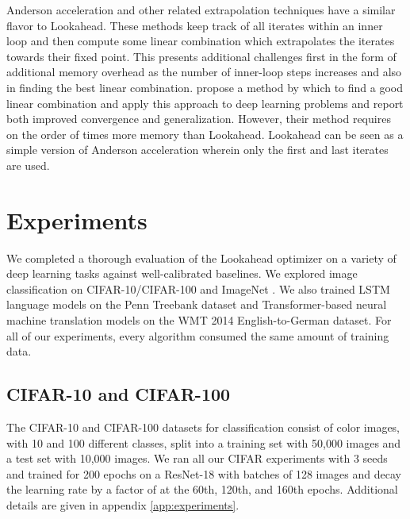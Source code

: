 \documentclass{article}
\begin{document}
Anderson acceleration \citep{anderson1965iterative} and other related extrapolation techniques \citep{brezinski2013extrapolation} have a similar flavor to Lookahead. These methods keep track of all iterates within an inner loop and then compute some linear combination which extrapolates the iterates towards their fixed point. This presents additional challenges first in the form of additional memory overhead as the number of inner-loop steps increases and also in finding the best linear combination. \citet{scieur2018nonlinear, scieur2018nonlinear2} propose a  method by which to find a good linear combination and apply this approach to deep learning problems and report both improved convergence and generalization. However, their method requires on the order of  times more memory than Lookahead. Lookahead can be seen as a simple version of Anderson acceleration wherein only the first and last iterates are used. 


 \section{Experiments}
\label{sec:experiments}

We completed a thorough evaluation of the Lookahead optimizer on a variety of deep learning tasks against well-calibrated baselines. We explored image classification on CIFAR-10/CIFAR-100 \citep{krizhevsky2009learning} and ImageNet \citep{deng2009imagenet}. We also trained LSTM language models on the Penn Treebank dataset \citep{marcus1993building} and Transformer-based \citep{vaswani2017attention} neural machine translation models on the WMT 2014 English-to-German dataset. For all of our experiments, every algorithm consumed the same amount of training data. 



\subsection{CIFAR-10 and CIFAR-100} 
\label{sec:cifar}

The CIFAR-10 and CIFAR-100 datasets for classification consist of  color images, with 10 and 100 different classes, split into a training set with 50,000 images and a test set with 10,000 images. We ran all our CIFAR experiments with 3 seeds and trained for 200 epochs on a ResNet-18 \citep{he2016deep} with batches of 128 images and decay the learning rate by a factor of  at the 60th, 120th, and 160th epochs.  Additional details are given in appendix \ref{app:experiments}.
\end{document}
